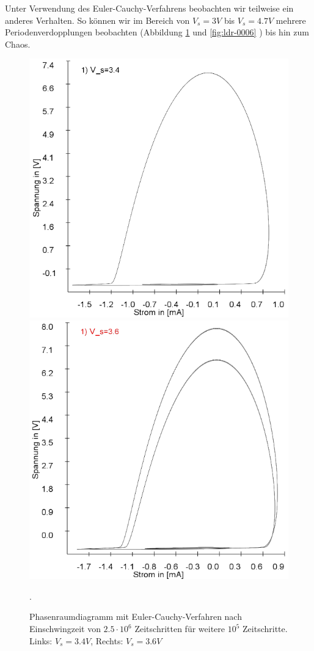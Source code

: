 \documentclass{scrartcl}
\begin{document}
Unter Verwendung des Euler-Cauchy-Verfahrens beobachten wir teilweise ein anderes Verhalten. So können wir im Bereich von $V_s=3V$ bis $V_s=4.7V$ mehrere Periodenverdopplungen beobachten (Abbildung \ref{fig:ldr-0005} und \ref{fig:ldr-0006} ) bis hin zum Chaos.
\begin{figure}
\includegraphics[scale=0.42]{schwing-euler-nach2500k-weitere100k-3,4V}
\includegraphics[scale=0.42]{schwing-euler-nach2500k-weitere100k-3,6V}
\caption{Phasenraumdiagramm mit Euler-Cauchy-Verfahren nach Einschwingzeit von $2.5\cdot10^6$ Zeitschritten für weitere $10^5$ Zeitschritte. Links: $V_s=3.4V$, Rechts: $V_s=3.6V$}. 
\label{fig:ldr-0005}
\end{figure}
\end{document}
